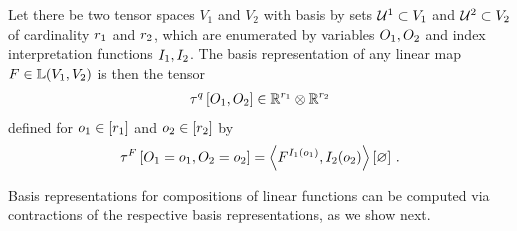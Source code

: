 \begin{definition}
    Let there be two tensor spaces $V_1$ and $V_2$ with basis by sets $\mathcal{U}^{1}\subset V_1$ and $\mathcal{U}^{2}\subset V_2$ of cardinality $r_{1}$ and $r_{2}$, which are enumerated by variables $O_{1},O_{2}$ and index interpretation functions $I_{1},I_{2}$.
    The basis representation of any linear map $F\in\mathbb{L}(V_1,V_2)$ is then the tensor
    \begin{align*}
        \tau^{q}\left[O_{1},O_{2}\right] \in \mathbb{R}^{r_{1}} \otimes \mathbb{R}^{r_{2}}
    \end{align*}
    defined for $o_{1}\in[r_{1}]$ and $o_{2}\in[r_{2}]$ by
    \begin{align*}
        \tau^{F}\left[O_{1}=o_{1},O_{2}=o_{2}\right]
        = \left\langle F^{I_{1}(o_{1})},I_{2}(o_{2})\right\rangle \left[ \varnothing \right] \, .
    \end{align*}
\end{definition}

Basis representations for compositions of linear functions can be computed via contractions of the respective basis representations, as we show next.

